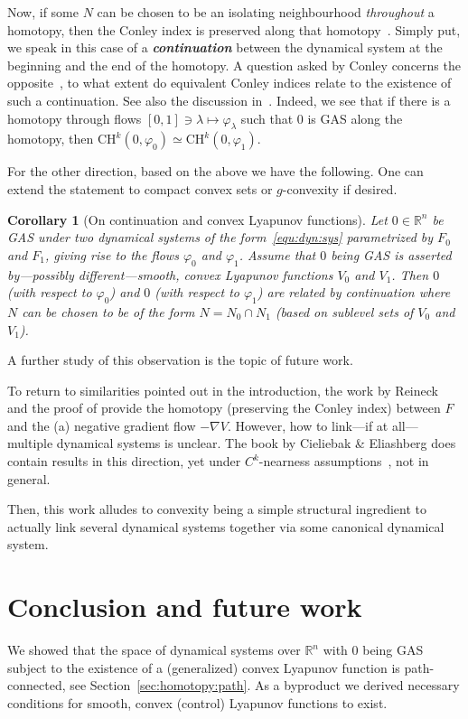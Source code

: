 \documentclass[letterpaper, 10 pt, conference]{ieeeconf}  %
\theoremstyle{mystyle}
\newtheorem{corollary}[theorem]{Corollary}
\begin{document}
Now, if some $N$ can be chosen to be an isolating neighbourhood \textit{throughout} a homotopy, then the Conley index is preserved along that homotopy~\cite[Thm.~1.10]{ref:mrozek1994shape}. Simply put, we speak in this case of a \textit{\textbf{continuation}} between the dynamical system at the beginning and the end of the homotopy. A question asked by Conley concerns the opposite~\cite[p.~83]{ref:conley1978isolated}, to what extent do equivalent Conley indices relate to the existence of such a continuation. See also the discussion in~\cite{ref:mrozek2000conley,ref:kvalheim2022obstructions}. Indeed, we see that if there is a homotopy through flows $[0,1]\ni\lambda\mapsto \varphi_{\lambda}$ such that $0$ is GAS along the homotopy, then $\mathrm{CH}^k(0,\varphi_0)\simeq \mathrm{CH}^k(0,\varphi_1)$.

For the other direction, based on the above we have the following. One can extend the statement to compact convex sets or $g$-convexity if desired. 
\begin{corollary}[On continuation and convex Lyapunov functions]
  Let $0\in \mathbb{R}^n$ be GAS under two dynamical systems of the form~\eqref{equ:dyn:sys} parametrized by $F_0$ and $F_1$, giving rise to the flows $\varphi_0$ and $\varphi_1$. Assume that $0$ being GAS is asserted by---possibly different---smooth, convex Lyapunov functions $V_0$ and $V_1$. Then $0$ (with respect to $\varphi_0$) and $0$ (with respect to $\varphi_1$) are related by continuation where $N$ can be chosen to be of the form $N=N_0\cap N_1$ (based on sublevel sets of $V_0$ and $V_1$).  
\end{corollary}
 A further study of this observation is the topic of future work. 

To return to similarities pointed out in the introduction, the work by Reineck~\cite{ref:reineck1991continuation} and the proof of \cite[Thm.~11.4]{ref:coron2007control} provide the homotopy (preserving the Conley index) between $F$ and the (a) negative gradient flow $-\nabla V$. However, how to link---if at all--- multiple dynamical systems is unclear. The book by Cieliebak \& Eliashberg does contain results in this direction, yet under $C^k$-nearness assumptions~\cite[Ch.~9]{ref:cieliebak2012stein}, not in general. 

Then, this work alludes to convexity being a simple structural ingredient to actually link several dynamical systems together via some canonical dynamical system. 

\section{Conclusion and future work}
\label{sec:conclusion}
{
We showed that the space of dynamical systems over $\mathbb{R}^n$ with $0$ being GAS subject to the existence of a (generalized) convex Lyapunov function is path-connected, see Section~\ref{sec:homotopy:path}. As a byproduct we derived necessary conditions for smooth, convex (control) Lyapunov functions to exist.}
\end{document}
